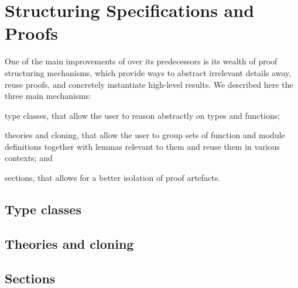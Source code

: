 \chapter{Structuring Specifications and Proofs}

One of the main improvements of  over its predecessors is its
wealth of proof structuring mechanisms, which provide ways to abstract
irrelevant details away, reuse proofs, and concretely instantiate high-level
results. We described here the three main mechanisms:
\begin{inparaenum}
\item type classes, that allow the user to reason abstractly on types and
      functions;
\item theories and cloning, that allow the user to group sets of function and
      module definitions together with lemmas relevant to them and reuse
      them in various contexts; and
\item sections, that allows for a better isolation of proof artefacts.
\end{inparaenum}

\section{Type classes}

\section{Theories and cloning\label{sec:cloning}}

\section{Sections\label{sec:sections}}

